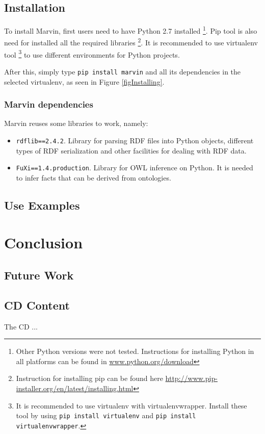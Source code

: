 \documentclass{report}
\begin{document}

\section{Installation}

To install Marvin, first users need to have Python 2.7 installed \footnote{Other Python versions were not tested. Instructions for installing Python in all platforms can be found in \url{www.python.org/download}}.
Pip tool is also need for installed all the required libraries \footnote{Instruction for installing pip can be found here \url{http://www.pip-installer.org/en/latest/installing.html}}.
It is recommended to use virtualenv tool \footnote{It is recommended to use virtualenv with virtualenvwrapper. Install these tool by using \texttt{pip install virtualenv} and \texttt{pip install virtualenvwrapper}.} to use different environments for Python projects.

After this, simply type \texttt{pip install marvin} and all its dependencies in the selected virtualenv, as seen in Figure \ref{figInstalling}.


\subsection{Marvin dependencies}

Marvin reuses some libraries to work, namely:

\begin{itemize}
    \item \texttt{rdflib==2.4.2}. Library for parsing RDF files into Python objects, different types of RDF serialization and other facilities for dealing with RDF data.
    \item \texttt{FuXi==1.4.production}. Library for OWL inference on Python.
        It is needed to infer facts that can be derived from ontologies.
\end{itemize}
\section{Use Examples}

\chapter{Conclusion}
\label{conclusion}

\section{Future Work}

\begin{appendices}
\chapter{CD Content}

The CD ...

\end{appendices}



\end{document}
